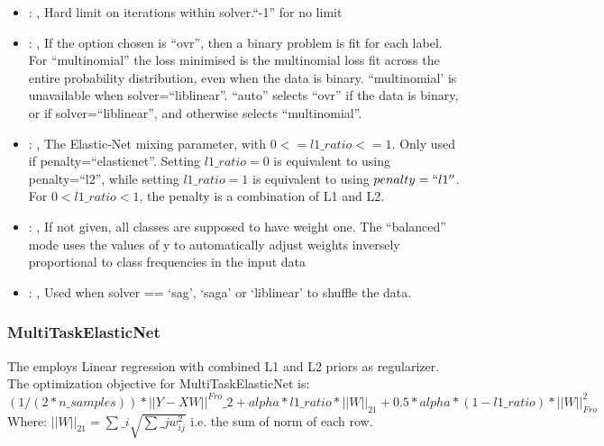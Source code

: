 \begin{itemize}
    \item {}: ,
      Hard limit on iterations within solver.``-1'' for no limit

    \item {}: ,
      If the option chosen is ``ovr'', then a binary problem is fit for each label. For
      ``multinomial''                                                  the loss minimised is the
      multinomial loss fit across the entire probability distribution, even when the
      data is binary. ``multinomial' is unavailable when solver=``liblinear''. ``auto'' selects
      ``ovr'' if the data is                                                  binary, or if
      solver=``liblinear'', and otherwise selects ``multinomial''.

    \item {}: ,
      The Elastic-Net mixing parameter, with $0 <= l1\_ratio <= 1$. Only used if
      penalty=``elasticnet''.                                                  Setting $l1\_ratio=0$
      is equivalent to using penalty=``l2'', while setting $l1\_ratio=1$ is equivalent to using
      $penalty=``l1''$. For $0 < l1\_ratio <1$, the penalty is a combination of L1 and L2.

    \item {}: \xmlDesc{[balanced]},
      If not given, all classes are supposed to have weight one.
      The “balanced” mode uses the values of y to automatically adjust weights
      inversely proportional to class frequencies in the input data

    \item {}: ,
      Used when solver == ‘sag’, ‘saga’ or ‘liblinear’ to shuffle the data.
  \end{itemize}


\subsubsection{MultiTaskElasticNet}
  The  employs                         Linear regression with combined
  L1 and L2 priors as regularizer.                         The optimization objective for
  MultiTaskElasticNet is:                         $(1 / (2 * n\_samples)) * ||Y - XW||^{Fro}\_2
  + alpha * l1\_ratio * ||W||_{21}                         + 0.5 * alpha * (1 - l1\_ratio) *
  ||W||_{Fro}^2$                         \\Where:                         $||W||_{21} = \sum\_i
  \sqrt{\sum\_j w_{ij}^2}$                         i.e. the sum of norm of each row.

